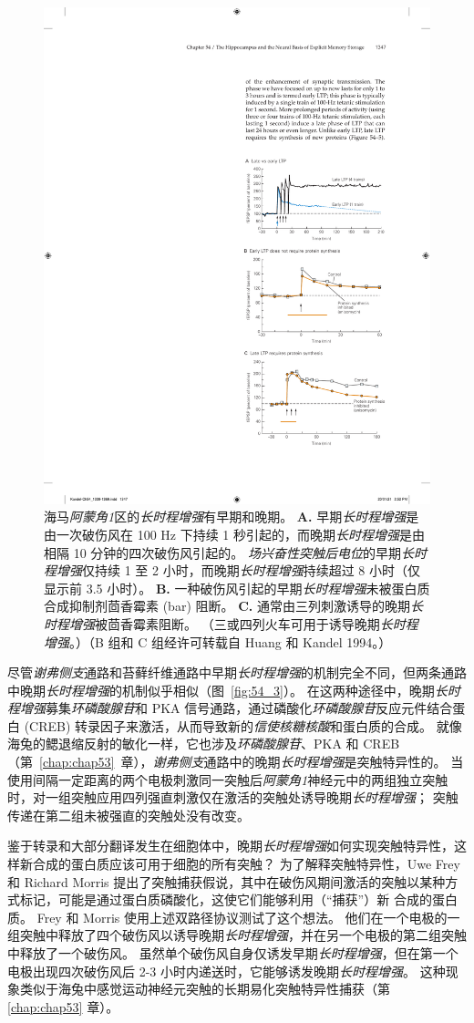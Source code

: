 \begin{figure}[htbp]
	\centering
	\includegraphics[width=0.5\linewidth]{chap54/fig_54_5}
	\caption{海马\textit{阿蒙角1}区的\textit{长时程增强}有早期和晚期。
		\textbf{A.} 早期\textit{长时程增强}是由一次破伤风在 100 Hz 下持续 1 秒引起的，而晚期\textit{长时程增强}是由相隔 10 分钟的四次破伤风引起的。
		\textit{场兴奋性突触后电位}的早期\textit{长时程增强}仅持续 1 至 2 小时，而晚期\textit{长时程增强}持续超过 8 小时（仅显示前 3.5 小时）。
		\textbf{B.} 一种破伤风引起的早期\textit{长时程增强}未被蛋白质合成抑制剂茴香霉素 (bar) 阻断。
		\textbf{C.} 通常由三列刺激诱导的晚期\textit{长时程增强}被茴香霉素阻断。 （三或四列火车可用于诱导晚期\textit{长时程增强}。）（B 组和 C 组经许可转载自 Huang 和 Kandel 1994。）}
	\label{fig:54_5}
\end{figure}


尽管\textit{谢弗侧支}通路和苔藓纤维通路中早期\textit{长时程增强}的机制完全不同，但两条通路中晚期\textit{长时程增强}的机制似乎相似（图~\ref{fig:54_3}）。
在这两种途径中，晚期\textit{长时程增强}募集\textit{环磷酸腺苷}和 PKA 信号通路，通过磷酸化\textit{环磷酸腺苷}反应元件结合蛋白 (CREB) 转录因子来激活，从而导致新的\textit{信使核糖核酸}和蛋白质的合成。
就像海兔的鳃退缩反射的敏化一样，它也涉及\textit{环磷酸腺苷}、PKA 和 CREB（第~\ref{chap:chap53}~章），\textit{谢弗侧支}通路中的晚期\textit{长时程增强}是突触特异性的。 当使用间隔一定距离的两个电极刺激同一突触后\textit{阿蒙角1}神经元中的两组独立突触时，对一组突触应用四列强直刺激仅在激活的突触处诱导晚期\textit{长时程增强}；
突触传递在第二组未被强直的突触处没有改变。


鉴于转录和大部分翻译发生在细胞体中，晚期\textit{长时程增强}如何实现突触特异性，这样新合成的蛋白质应该可用于细胞的所有突触？
为了解释突触特异性，Uwe Frey 和 Richard Morris 提出了突触捕获假说，其中在破伤风期间激活的突触以某种方式标记，可能是通过蛋白质磷酸化，这使它们能够利用（“捕获”）新 合成的蛋白质。
Frey 和 Morris 使用上述双路径协议测试了这个想法。
他们在一个电极的一组突触中释放了四个破伤风以诱导晚期\textit{长时程增强}，并在另一个电极的第二组突触中释放了一个破伤风。
虽然单个破伤风自身仅诱发早期\textit{长时程增强}，但在第一个电极出现四次破伤风后 2-3 小时内递送时，它能够诱发晚期\textit{长时程增强}。
这种现象类似于海兔中感觉运动神经元突触的长期易化突触特异性捕获（第 \ref{chap:chap53} 章）。


